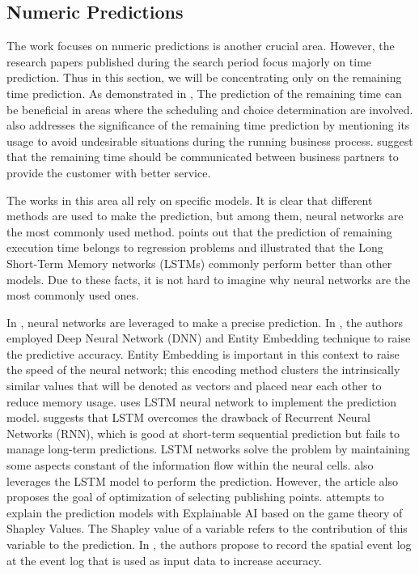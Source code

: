 \documentclass[runningheads]{llncs}
\begin{document}
		\subsection{Numeric Predictions}
		The work focuses on numeric predictions is another crucial area. However, the research papers published during the search period focus majorly on time prediction. Thus in this section, we will be concentrating only on the remaining time prediction. As demonstrated in \cite{art-13}, The prediction of the remaining time can be beneficial in areas where the scheduling and choice determination are involved. \cite{art-15} also addresses the significance of the remaining time prediction by mentioning its usage to avoid undesirable situations during the running business process. \cite{art-29} suggest that the remaining time should be communicated between business partners to provide the customer with better service. 
		
		The works in this area all rely on specific models. It is clear that different methods are used to make the prediction, but among them, neural networks are the most commonly used method. \cite{art-29} points out that the prediction of remaining execution time belongs to regression problems and \cite{art-17} illustrated that the Long Short-Term Memory networks (LSTMs) commonly perform better than other models. Due to these facts, it is not hard to imagine why neural networks are the most commonly used ones.
		
		In\cite{art-15} \cite{art-21} \cite{art-29}, neural networks are leveraged to make a precise prediction. In \cite{art-15}, the authors employed Deep Neural Network (DNN) and Entity Embedding technique to raise the predictive accuracy. Entity Embedding is important in this context to raise the speed of the neural network; this encoding method clusters the intrinsically similar values that will be denoted as vectors and placed near each other to reduce memory usage. \cite{art-21} uses LSTM neural network to implement the prediction model. \cite{art-21} suggests that LSTM overcomes the drawback of Recurrent Neural Networks (RNN), which is good at short-term sequential prediction but fails to manage long-term predictions. LSTM networks solve the problem by maintaining some aspects constant of the information flow within the neural cells. \cite{art-29} also leverages the LSTM model to perform the prediction. However, the article also proposes the goal of optimization of selecting publishing points. \cite{art-17} attempts to explain the prediction models with Explainable AI based on the game theory of Shapley Values. The Shapley value of a variable refers to the contribution of this variable to the prediction. In \cite{art-13}, the authors propose to record the spatial event log at the event log that is used as input data to increase accuracy.       
\end{document}
